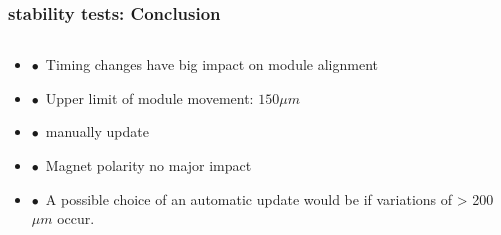 \documentclass[aspectratio=1610, 12pt, xcolor=dvipsnames]{beamer}
\begin{document}
\begin{frame}\frametitle{stability tests: Conclusion}
  \begin{columns}
    \begin{column}[c]{\textwidth}
      \begin{itemize}
        \item $\bullet$\, Timing changes have big impact on module alignment
        \item $\bullet$\, Upper limit of module movement: $150 \mu m$ %
        \item $\bullet$\, \to manually update
        \item $\bullet$\, Magnet polarity no major impact
        \item $\bullet$\, A possible choice of an automatic update would be if variations of > 200 $\mu m$ occur.
      \end{itemize}
    \end{column}
  \end{columns}
\end{frame}

%         
\end{document}

